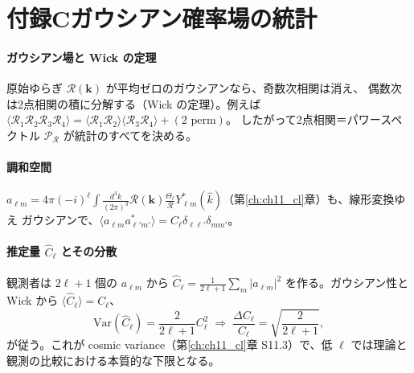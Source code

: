 \section*{付録C\quad ガウシアン確率場の統計}

\paragraph{ガウシアン場と Wick の定理}
原始ゆらぎ $\mathcal R(\mathbf k)$ が平均ゼロのガウシアンなら、奇数次相関は消え、
偶数次は2点相関の積に分解する（Wick の定理）。例えば
$\langle\mathcal R_1\mathcal R_2\mathcal R_3\mathcal R_4\rangle
=\langle\mathcal R_1\mathcal R_2\rangle\langle\mathcal R_3\mathcal R_4\rangle+(\text{2 perm})$。
したがって2点相関＝パワースペクトル $\mathcal P_\mathcal R$ が統計のすべてを決める。

\paragraph{調和空間}
$a_{\ell m}=4\pi(-i)^\ell\int\frac{d^3k}{(2\pi)^3}\mathcal R(\mathbf k)
\frac{\Theta_\ell}{\mathcal R}Y^*_{\ell m}(\hat k)$（第\ref{ch:ch11_cl}章）も、線形変換ゆえ
ガウシアンで、$\langle a_{\ell m}a^*_{\ell'm'}\rangle=C_\ell\delta_{\ell\ell'}\delta_{mm'}$。

\paragraph{推定量 $\hat C_\ell$ とその分散}
観測者は $2\ell+1$ 個の $a_{\ell m}$ から $\hat C_\ell=\frac{1}{2\ell+1}\sum_m|a_{\ell m}|^2$
を作る。ガウシアン性と Wick から $\langle\hat C_\ell\rangle=C_\ell$、
\begin{equation}
  \mathrm{Var}(\hat C_\ell)=\frac{2}{2\ell+1}C_\ell^2
  \;\Rightarrow\;\frac{\Delta C_\ell}{C_\ell}=\sqrt{\frac{2}{2\ell+1}},
\end{equation}
が従う。これが cosmic variance（第\ref{ch:ch11_cl}章 S11.3）で、低 $\ell$ では理論と
観測の比較における本質的な下限となる。
